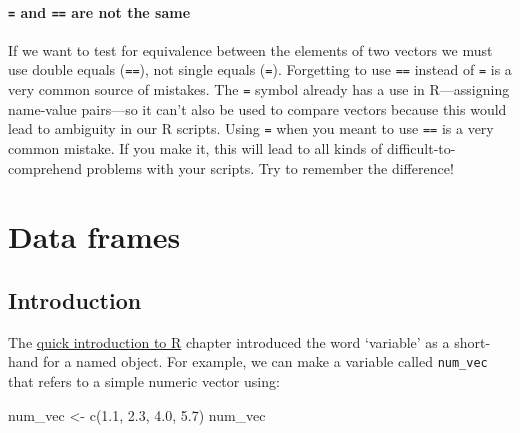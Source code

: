 \documentclass[
]{book}
\newenvironment{Shaded}{\begin{snugshade}}{\end{snugshade}}
\newcommand{\FloatTok}[1]{\textcolor[rgb]{0.00,0.00,0.81}{#1}}
\newcommand{\FunctionTok}[1]{\textcolor[rgb]{0.00,0.00,0.00}{#1}}
\newcommand{\NormalTok}[1]{#1}
\newcommand{\OtherTok}[1]{\textcolor[rgb]{0.56,0.35,0.01}{#1}}
\newenvironment{greybox}{
  \definecolor{shadecolor}{rgb}{0.95,0.95,0.95}  %
  \color{black}
  \begin{shaded}}
 {\end{shaded}}
\newenvironment{infobox}[1]
  {
  \begin{itemize}
  \renewcommand{\labelitemi}{
    \raisebox{-.7\height}[0pt][0pt]{
      {\setkeys{Gin}{width=3em,keepaspectratio}
        \texttt{[image: images/\#1]}}
    }
  }
  \setlength{\fboxsep}{1em}
  \begin{greybox}
  \item
  }
  {
  \end{greybox}
  \end{itemize}
  }
\begin{document}
\begin{infobox}{warning}

\hypertarget{and-are-not-the-same}{%
\subsubsection*{\texorpdfstring{\texttt{=} and \texttt{==} are not the same}{= and == are not the same}}\label{and-are-not-the-same}}

If we want to test for equivalence between the elements of two vectors we must use double equals (\texttt{==}), not single equals (\texttt{=}). Forgetting to use \texttt{==} instead of \texttt{=} is a very common source of mistakes. The \texttt{=} symbol already has a use in R---assigning name-value pairs---so it can't also be used to compare vectors because this would lead to ambiguity in our R scripts. Using \texttt{=} when you meant to use \texttt{==} is a very common mistake. If you make it, this will lead to all kinds of difficult-to-comprehend problems with your scripts. Try to remember the difference!

\end{infobox}

\hypertarget{chapter-data-frames}{%
\chapter{Data frames}\label{chapter-data-frames}}

\hypertarget{introduction-1}{%
\section{Introduction}\label{introduction-1}}

The \protect\hyperlink{quick-intro-to-r}{quick introduction to R} chapter introduced the word `variable' as a short-hand for a named object. For example, we can make a variable called \texttt{num\_vec} that refers to a simple numeric vector using:

\begin{Shaded}
\begin{Highlighting}[]
\NormalTok{num\_vec }\OtherTok{\textless{}{-}} \FunctionTok{c}\NormalTok{(}\FloatTok{1.1}\NormalTok{, }\FloatTok{2.3}\NormalTok{, }\FloatTok{4.0}\NormalTok{, }\FloatTok{5.7}\NormalTok{)}
\NormalTok{num\_vec}
\end{Highlighting}
\end{Shaded}
\end{document}
